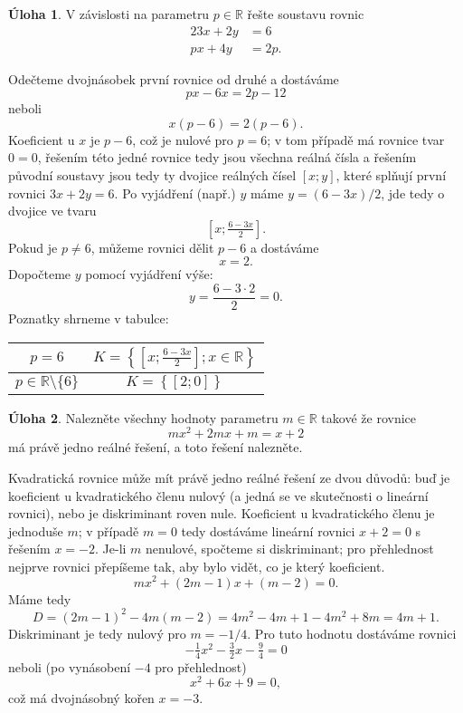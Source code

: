 \documentclass[12pt,a4paper]{article}
\newcommand{\R}{\mathbb{R}}
\theoremstyle{definition}
\newtheorem{uloha}{Úloha}
\newenvironment{res}{\proof}{\endproof}
\begin{document}
\begin{uloha}
V závislosti na parametru $p \in \R$ řešte soustavu rovnic
\useshortskip
\begin{alignat*}{2}
3x + 2y &= 6 \\
px + 4y &= 2p.
\end{alignat*}
\end{uloha}
\begin{res}
Odečteme dvojnásobek první rovnice od druhé a dostáváme
\[ px - 6x = 2p - 12 \]
neboli
\[ x(p-6) = 2(p-6). \]
Koeficient u $x$ je $p-6$, což je nulové pro $p = 6$; v tom případě má rovnice tvar $0 = 0$, řešením této jedné rovnice tedy jsou všechna reálná čísla a řešením původní soustavy jsou tedy ty dvojice reálných čísel $[x; y]$, které splňují první rovnici $3x + 2y = 6$. Po vyjádření (např.) $y$ máme $y = (6-3x)/2$, jde tedy o dvojice ve tvaru
\[ \left[x; \tfrac{6-3x}{2}\right]. \]
Pokud je $p \neq 6$, můžeme rovnici dělit $p-6$ a dostáváme
\[ x = 2. \]
Dopočteme $y$ pomocí vyjádření výše:
\[ y = \frac{6 - 3 \cdot 2}{2} = 0. \]
Poznatky shrneme v tabulce:
\begin{center}
\begin{tabular}{c|c}
$p = 6$ & $K = \left\{\left[x; \tfrac{6-3x}{2}\right]; x \in \R\right\}$ \\ \hline
$p \in \R \setminus \{6\}$ & $K = \left\{[2; 0]\right\}$
\end{tabular}
\end{center}
\end{res}


\begin{uloha}
Nalezněte všechny hodnoty parametru $m \in \R$ takové že rovnice
\[ mx^2 + 2mx + m = x + 2 \]
má právě jedno reálné řešení, a toto řešení nalezněte.
\end{uloha}
\begin{res}
Kvadratická rovnice může mít právě jedno reálné řešení ze dvou důvodů: buď je koeficient u kvadratického členu nulový (a jedná se ve skutečnosti o lineární rovnici), nebo je diskriminant roven nule. Koeficient u kvadratického členu je jednoduše $m$; v případě $m = 0$ tedy dostáváme lineární rovnici $x + 2 = 0$ s řešením $x = -2$. Je-li $m$ nenulové, spočteme si diskriminant; pro přehlednost nejprve rovnici přepíšeme tak, aby bylo vidět, co je který koeficient.
\[ mx^2 + (2m-1)x + (m-2) = 0. \]
Máme tedy
\[ D = (2m-1)^2 - 4m(m-2) = 4m^2 - 4m + 1 - 4m^2 + 8m = 4m + 1. \]
Diskriminant je tedy nulový pro $m = -1/4$. Pro tuto hodnotu dostáváme rovnici
\[ -\tfrac14 x^2 - \tfrac32 x - \tfrac 94 = 0 \]
neboli (po vynásobení $-4$ pro přehlednost)
\[ x^2 + 6x + 9 = 0, \]
což má dvojnásobný kořen $x = -3$.
\end{res}
\end{document}
